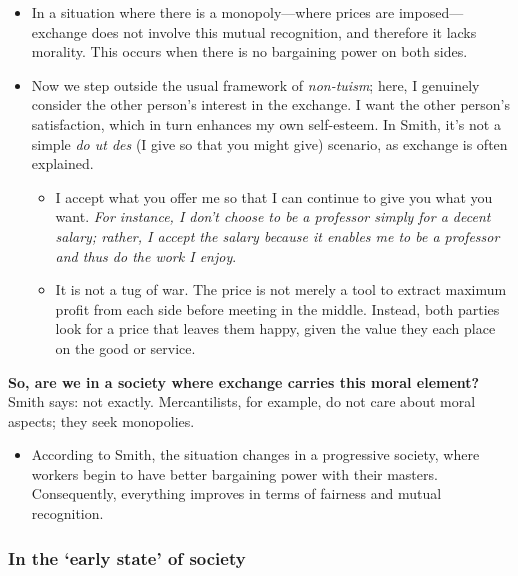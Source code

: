 \begin{remark}
\begin{itemize}
    \item In a situation where there is a monopoly---where prices are imposed---exchange does not involve this mutual recognition, and therefore it lacks morality. This occurs when there is no bargaining power on both sides.
    \item Now we step outside the usual framework of \textit{non-tuism}; here, I genuinely consider the other person’s interest in the exchange. I want the other person’s satisfaction, which in turn enhances my own self-esteem. In Smith, it’s not a simple \textit{do ut des} (I give so that you might give) scenario, as exchange is often explained.
        \begin{itemize}
            \item I accept what you offer me so that I can continue to give you what you want. \textit{For instance, I don’t choose to be a professor simply for a decent salary; rather, I accept the salary because it enables me to be a professor and thus do the work I enjoy}.
            \item It is not a tug of war. The price is not merely a tool to extract maximum profit from each side before meeting in the middle. Instead, both parties look for a price that leaves them happy, given the value they each place on the good or service.
        \end{itemize}
\end{itemize}
\end{remark}

\begin{remark}
\textbf{So, are we in a society where exchange carries this moral element?} Smith says: not exactly. Mercantilists, for example, do not care about moral aspects; they seek monopolies.
    \begin{itemize}
        \item According to Smith, the situation changes in a progressive society, where workers begin to have better bargaining power with their masters. Consequently, everything improves in terms of fairness and mutual recognition.
    \end{itemize}
\end{remark}

\subsubsection{In the ‘early state’ of society}

